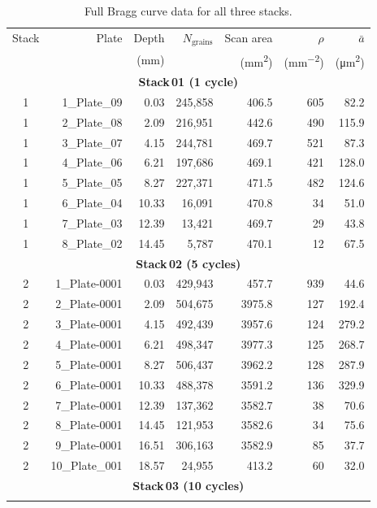\documentclass[12pt,a4paper]{article}
\begin{document}
\begin{table}[H]
\centering
\caption{Full Bragg curve data for all three stacks.}
\label{tab:bragg_full}
\begin{tabular}{crrrrrr}
\toprule
Stack & Plate & Depth & $N_{\text{grains}}$ & Scan area &
$\rho$ & $\bar{a}$ \\
 & & (mm) & & (\si{\mm\squared}) &
(\si{\mm^{-2}}) & (\si{\micro\meter\squared}) \\
\midrule
\multicolumn{7}{c}{\textbf{Stack\,01 (1 cycle)}} \\
\rule{0pt}{2ex}
1 & 1\_Plate\_09 & 0.03 & 245,858 & 406.5 & 605 & 82.2 \\
1 & 2\_Plate\_08 & 2.09 & 216,951 & 442.6 & 490 & 115.9 \\
1 & 3\_Plate\_07 & 4.15 & 244,781 & 469.7 & 521 & 87.3 \\
1 & 4\_Plate\_06 & 6.21 & 197,686 & 469.1 & 421 & 128.0 \\
1 & 5\_Plate\_05 & 8.27 & 227,371 & 471.5 & 482 & 124.6 \\
1 & 6\_Plate\_04 & 10.33 & 16,091 & 470.8 & 34 & 51.0 \\
1 & 7\_Plate\_03 & 12.39 & 13,421 & 469.7 & 29 & 43.8 \\
1 & 8\_Plate\_02 & 14.45 & 5,787 & 470.1 & 12 & 67.5 \\
\midrule
\multicolumn{7}{c}{\textbf{Stack\,02 (5 cycles)}} \\
\rule{0pt}{2ex}
2 & 1\_Plate-0001 & 0.03 & 429,943 & 457.7 & 939 & 44.6 \\
2 & 2\_Plate-0001 & 2.09 & 504,675 & 3975.8 & 127 & 192.4 \\
2 & 3\_Plate-0001 & 4.15 & 492,439 & 3957.6 & 124 & 279.2 \\
2 & 4\_Plate-0001 & 6.21 & 498,347 & 3977.3 & 125 & 268.7 \\
2 & 5\_Plate-0001 & 8.27 & 506,437 & 3962.2 & 128 & 287.9 \\
2 & 6\_Plate-0001 & 10.33 & 488,378 & 3591.2 & 136 & 329.9 \\
2 & 7\_Plate-0001 & 12.39 & 137,362 & 3582.7 & 38 & 70.6 \\
2 & 8\_Plate-0001 & 14.45 & 121,953 & 3582.6 & 34 & 75.6 \\
2 & 9\_Plate-0001 & 16.51 & 306,163 & 3582.9 & 85 & 37.7 \\
2 & 10\_Plate\_001 & 18.57 & 24,955 & 413.2 & 60 & 32.0 \\
\midrule
\multicolumn{7}{c}{\textbf{Stack\,03 (10 cycles)}} \\
\rule{0pt}{2ex}

\end{tabular}
\end{table}
\end{document}
